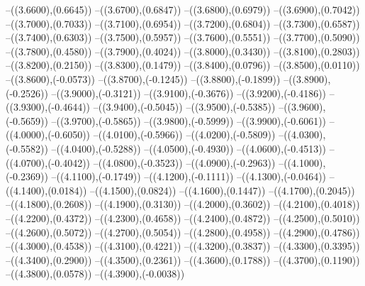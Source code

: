 {	--({\sx*(3.6600)},{\sy*(0.6645)})
	--({\sx*(3.6700)},{\sy*(0.6847)})
	--({\sx*(3.6800)},{\sy*(0.6979)})
	--({\sx*(3.6900)},{\sy*(0.7042)})
	--({\sx*(3.7000)},{\sy*(0.7033)})
	--({\sx*(3.7100)},{\sy*(0.6954)})
	--({\sx*(3.7200)},{\sy*(0.6804)})
	--({\sx*(3.7300)},{\sy*(0.6587)})
	--({\sx*(3.7400)},{\sy*(0.6303)})
	--({\sx*(3.7500)},{\sy*(0.5957)})
	--({\sx*(3.7600)},{\sy*(0.5551)})
	--({\sx*(3.7700)},{\sy*(0.5090)})
	--({\sx*(3.7800)},{\sy*(0.4580)})
	--({\sx*(3.7900)},{\sy*(0.4024)})
	--({\sx*(3.8000)},{\sy*(0.3430)})
	--({\sx*(3.8100)},{\sy*(0.2803)})
	--({\sx*(3.8200)},{\sy*(0.2150)})
	--({\sx*(3.8300)},{\sy*(0.1479)})
	--({\sx*(3.8400)},{\sy*(0.0796)})
	--({\sx*(3.8500)},{\sy*(0.0110)})
	--({\sx*(3.8600)},{\sy*(-0.0573)})
	--({\sx*(3.8700)},{\sy*(-0.1245)})
	--({\sx*(3.8800)},{\sy*(-0.1899)})
	--({\sx*(3.8900)},{\sy*(-0.2526)})
	--({\sx*(3.9000)},{\sy*(-0.3121)})
	--({\sx*(3.9100)},{\sy*(-0.3676)})
	--({\sx*(3.9200)},{\sy*(-0.4186)})
	--({\sx*(3.9300)},{\sy*(-0.4644)})
	--({\sx*(3.9400)},{\sy*(-0.5045)})
	--({\sx*(3.9500)},{\sy*(-0.5385)})
	--({\sx*(3.9600)},{\sy*(-0.5659)})
	--({\sx*(3.9700)},{\sy*(-0.5865)})
	--({\sx*(3.9800)},{\sy*(-0.5999)})
	--({\sx*(3.9900)},{\sy*(-0.6061)})
	--({\sx*(4.0000)},{\sy*(-0.6050)})
	--({\sx*(4.0100)},{\sy*(-0.5966)})
	--({\sx*(4.0200)},{\sy*(-0.5809)})
	--({\sx*(4.0300)},{\sy*(-0.5582)})
	--({\sx*(4.0400)},{\sy*(-0.5288)})
	--({\sx*(4.0500)},{\sy*(-0.4930)})
	--({\sx*(4.0600)},{\sy*(-0.4513)})
	--({\sx*(4.0700)},{\sy*(-0.4042)})
	--({\sx*(4.0800)},{\sy*(-0.3523)})
	--({\sx*(4.0900)},{\sy*(-0.2963)})
	--({\sx*(4.1000)},{\sy*(-0.2369)})
	--({\sx*(4.1100)},{\sy*(-0.1749)})
	--({\sx*(4.1200)},{\sy*(-0.1111)})
	--({\sx*(4.1300)},{\sy*(-0.0464)})
	--({\sx*(4.1400)},{\sy*(0.0184)})
	--({\sx*(4.1500)},{\sy*(0.0824)})
	--({\sx*(4.1600)},{\sy*(0.1447)})
	--({\sx*(4.1700)},{\sy*(0.2045)})
	--({\sx*(4.1800)},{\sy*(0.2608)})
	--({\sx*(4.1900)},{\sy*(0.3130)})
	--({\sx*(4.2000)},{\sy*(0.3602)})
	--({\sx*(4.2100)},{\sy*(0.4018)})
	--({\sx*(4.2200)},{\sy*(0.4372)})
	--({\sx*(4.2300)},{\sy*(0.4658)})
	--({\sx*(4.2400)},{\sy*(0.4872)})
	--({\sx*(4.2500)},{\sy*(0.5010)})
	--({\sx*(4.2600)},{\sy*(0.5072)})
	--({\sx*(4.2700)},{\sy*(0.5054)})
	--({\sx*(4.2800)},{\sy*(0.4958)})
	--({\sx*(4.2900)},{\sy*(0.4786)})
	--({\sx*(4.3000)},{\sy*(0.4538)})
	--({\sx*(4.3100)},{\sy*(0.4221)})
	--({\sx*(4.3200)},{\sy*(0.3837)})
	--({\sx*(4.3300)},{\sy*(0.3395)})
	--({\sx*(4.3400)},{\sy*(0.2900)})
	--({\sx*(4.3500)},{\sy*(0.2361)})
	--({\sx*(4.3600)},{\sy*(0.1788)})
	--({\sx*(4.3700)},{\sy*(0.1190)})
	--({\sx*(4.3800)},{\sy*(0.0578)})
	--({\sx*(4.3900)},{\sy*(-0.0038)})
}
